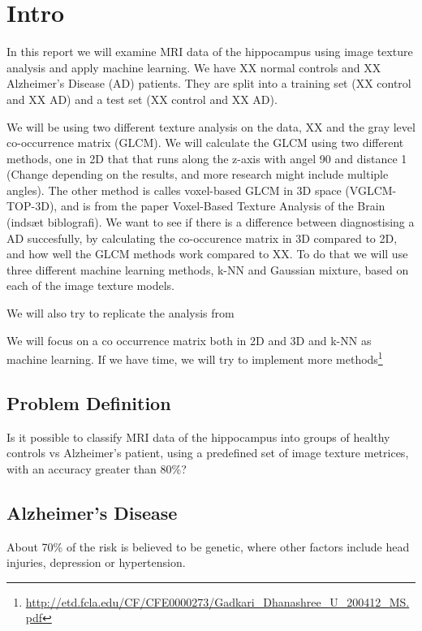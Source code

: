 \chapter{Intro}

In this report we will examine MRI data of the hippocampus using image texture analysis and apply machine learning. We have XX normal controls and XX Alzheimer's Disease (AD) patients. They are split into a training set (XX control and XX AD) and a test set (XX control and XX AD).

We will be using two different texture analysis on the data, XX and the gray level co-occ\-urren\-ce matrix (GLCM).
We will calculate the GLCM using two different methods, one in 2D that that runs along the z-axis with angel 90 and distance 1 (Change depending on the results, and more research might include multiple angles).\cite{Castellano}
The other method is calles voxel-based GLCM in 3D space (VGLCM-TOP-3D), and is from the paper Voxel-Based Texture Analysis of the Brain (indsæt biblografi).
We want to see if there is a difference between diagnostising a AD succesfully, by calculating the co-occurence matrix in 3D compared to 2D, and how well the GLCM methods work
compared to XX. To do that we will use three different machine learning methods, k-NN and Gaussian mixture, based on each of the image texture models.

We will also try to replicate the analysis from \cite{MRfreeborough}

We will focus on a co occurrence matrix both in 2D and 3D and k-NN as machine learning. If we have time, we will try to implement more methods\footnote{\url{http://etd.fcla.edu/CF/CFE0000273/Gadkari_Dhanashree_U_200412_MS.pdf}}

\section{Problem Definition}

Is it possible to classify MRI data of the hippocampus into groups of healthy controls vs Alzheimer's patient, using a predefined set of image texture metrices, with an accuracy great\-er than 80\%?

\section{Alzheimer's Disease}

About 70\% of the risk is believed to be genetic, where other factors include head injuries, depression or hypertension. \cite{Magnetic}

